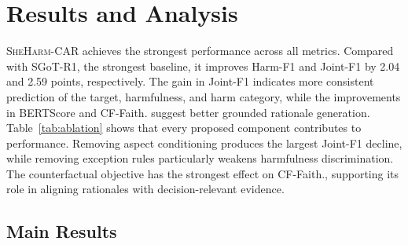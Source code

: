 \documentclass[11pt]{article}
\begin{document}

\section{Results and Analysis}
\label{sec:results}
\textsc{SheHarm-CAR} achieves the strongest performance across all
metrics. Compared with SGoT-R1, the strongest baseline, it improves
Harm-F1 and Joint-F1 by 2.04 and 2.59 points, respectively. The gain
in Joint-F1 indicates more consistent prediction of the target,
harmfulness, and harm category, while the improvements in BERTScore
and CF-Faith. suggest better grounded rationale generation. 
Table~\ref{tab:ablation} shows that every proposed component
contributes to performance. Removing aspect conditioning produces the
largest Joint-F1 decline, while removing exception rules particularly
weakens harmfulness discrimination. The counterfactual objective has
the strongest effect on CF-Faith., supporting its role in aligning
rationales with decision-relevant evidence.
\subsection{Main Results}
\end{document}
